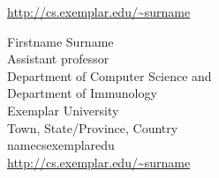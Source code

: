 \begin{tocauthors}
\begin{tocinfo}[jeffery]
 \url{http://cs.exemplar.edu/~surname}      %
\end{tocinfo}
\begin{tocinfo}[vidick]
 Firstname Surname\\
 Assistant professor\\
 Department of Computer Science and\\
 Department of Immunology\\
 Exemplar University\\
 Town, State/Province, Country\\
 name\tocat{}cs\tocdot{}exemplar\tocdot{}edu \\   %
 \url{http://cs.exemplar.edu/~surname}      %
\end{tocinfo}
\end{tocauthors}

